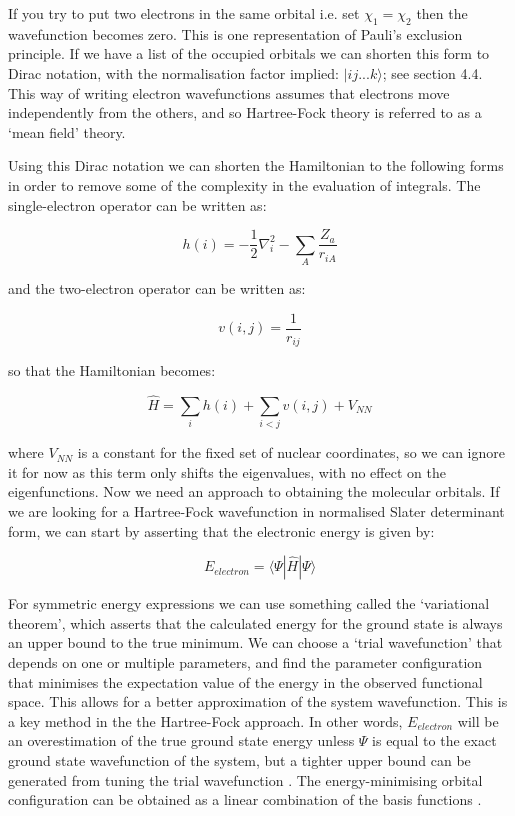 \documentclass[10pt]{article}
\begin{document}
If you try to put two electrons in the same orbital i.e. set $\chi_1 = \chi_2$ then the wavefunction becomes zero. This is one representation of Pauli's exclusion principle. If we have a list of the occupied orbitals we can shorten this form to Dirac notation, with the normalisation factor implied: $|ij...k\rangle$; see section 4.4. This way of writing electron wavefunctions assumes that electrons move independently from the others, and so Hartree-Fock theory is referred to as a `mean field' theory. 

Using this Dirac notation we can shorten the Hamiltonian to the following forms in order to remove some of the complexity in the evaluation of integrals. The single-electron operator can be written as:

\begin{equation*}
	h(i) = -\frac{1}{2}\nabla_i^2-\sum_A\frac{Z_a}{r_{iA}}
\end{equation*}

and the two-electron operator can be written as:

\begin{equation*}
	v(i,j)=\frac{1}{r_{ij}}
\end{equation*}

so that the Hamiltonian becomes:

\begin{equation*}
	\hat{H} = \sum_i h(i) + \sum_{i<j}v(i,j) + V_{NN}
\end{equation*}

where $V_{NN}$ is a constant for the fixed set of nuclear coordinates, so we can ignore it for now as this term only shifts the eigenvalues, with no effect on the eigenfunctions. Now we need an approach to obtaining the molecular orbitals. If we are looking for a Hartree-Fock wavefunction in normalised Slater determinant form, we can start by asserting that the electronic energy is given by:

\begin{equation*}
	E_{electron} = \langle\Psi|\hat{H}|\Psi\rangle
\end{equation*}

For symmetric energy expressions we can use something called the `variational theorem', which asserts that the calculated energy for the ground state is always an upper bound to the true minimum. We can choose a `trial wavefunction' that depends on one or multiple parameters, and find the parameter configuration that minimises the expectation value of the energy in the observed functional space. This allows for a better approximation of the system wavefunction. This is a key method in the the Hartree-Fock approach. In other words, $E_{electron}$ will be an overestimation of the true ground state energy unless $\Psi$ is equal to the exact ground state wavefunction of the system, but a tighter upper bound can be generated from tuning the trial wavefunction \cite{sakurai1994modern}.  The energy-minimising orbital configuration can be obtained as a linear combination of the basis functions \cite{sherrill2000introduction}. 
\end{document}
